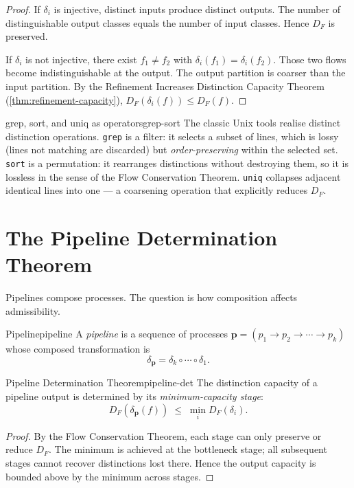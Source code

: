 \documentclass[12pt,twoside,openright]{book}
\newcommand{\csicon} {\marginpar{\tiny\color{DistBlue}\faCode}}
\begin{document}
\begin{proof}
  If $\delta_i$ is injective, distinct inputs produce
  distinct outputs. The number of distinguishable output
  classes equals the number of input classes.
  Hence $D_F$ is preserved.

  If $\delta_i$ is not injective, there exist
  $f_1 \ne f_2$ with $\delta_i(f_1) = \delta_i(f_2)$.
  Those two flows become indistinguishable at the output.
  The output partition is coarser than the input partition.
  By the Refinement Increases Distinction Capacity Theorem
  (\cref{thm:refinement-capacity}),
  $D_F(\delta_i(f)) \le D_F(f)$.
\end{proof}

\begin{remark}{grep, sort, and uniq as operators}{grep-sort}
  \csicon
  The classic Unix tools realise distinct distinction
  operations. \texttt{grep} is a filter: it selects a
  subset of lines, which is lossy (lines not matching are
  discarded) but \emph{order-preserving} within the
  selected set. \texttt{sort} is a permutation: it
  rearranges distinctions without destroying them, so it
  is lossless in the sense of the Flow Conservation
  Theorem. \texttt{uniq} collapses adjacent identical
  lines into one — a coarsening operation that explicitly
  reduces $D_F$.
\end{remark}

\section{The Pipeline Determination Theorem}

Pipelines compose processes. The question is how
composition affects admissibility.

\begin{definition}{Pipeline}{pipeline}
  A \emph{pipeline} is a sequence of processes
  $\mathbf{p} = (p_1 \to p_2 \to \cdots \to p_k)$
  whose composed transformation is
  \[
    \delta_\mathbf{p} = \delta_k \circ \cdots \circ \delta_1.
  \]
\end{definition}

\begin{theorem}{Pipeline Determination Theorem}{pipeline-det}
  The distinction capacity of a pipeline output is
  determined by its \emph{minimum-capacity stage}:
  \[
    D_F(\delta_\mathbf{p}(f))
    \;\le\;
    \min_{i} D_F(\delta_i).
  \]
\end{theorem}

\begin{proof}
  By the Flow Conservation Theorem, each stage can only
  preserve or reduce $D_F$. The minimum is achieved at
  the bottleneck stage; all subsequent stages cannot
  recover distinctions lost there. Hence the output
  capacity is bounded above by the minimum across stages.
\end{proof}
\end{document}
